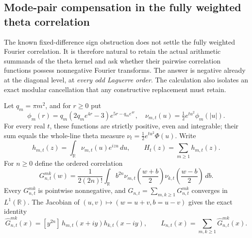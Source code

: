 \subsection{Mode-pair compensation in the fully weighted theta correlation}
\label{sec:modepaircompensation}

The known fixed-difference sign obstruction does not settle the
fully weighted Fourier correlation. It is therefore natural to
retain the actual arithmetic summands of the theta kernel and
ask whether their pairwise correlation functions possess
nonnegative Fourier transforms. The answer is negative already
at the diagonal level, at \emph{every odd Laguerre order}.
The calculation also isolates an exact modular cancellation
that any constructive replacement must retain.

Let \(q_m=\pi m^2\), and for \(r\ge0\) put
\[
\phi_m(r)=q_m(2q_me^{4r}-3)e^{5r-q_me^{4r}},
\quad
\nu_{m,t}(u)=\tfrac12e^{tu^2}\phi_m(|u|).
\]
For every real \(t\), these functions are strictly positive,
even and integrable; their sum equals the whole-line theta
measure \(\nu_t=\frac12e^{tu^2}\Phi(u)\). Write
\[
h_{m,t}(z)=\int_{\mathbb R}\nu_{m,t}(u)e^{izu}\,du,
\qquad H_t(z)=\sum_{m\ge1}h_{m,t}(z).
\]
For \(n\ge0\) define the ordered correlation
\begin{equation}
G^{mk}_{n,t}(w)=\frac{1}{2(2n)!}
\int_{\mathbb R}b^{2n}
\nu_{m,t}\!\left(\frac{w+b}{2}\right)
\nu_{k,t}\!\left(\frac{w-b}{2}\right)\,db.
\label{eq:modepairdef}
\end{equation}
Every \(G^{mk}_{n,t}\) is pointwise nonnegative, and
\(G_{n,t}=\sum_{m,k\ge1}G^{mk}_{n,t}\) converges in
\(L^1(\mathbb R)\). The Jacobian of
\((u,v)\mapsto(w=u+v,b=u-v)\) gives the exact identity
\begin{equation}
\widehat G^{mk}_{n,t}(x)
=[y^{2n}]\,h_{m,t}(x+iy)h_{k,t}(x-iy),
\qquad
L_{n,t}(x)=\sum_{m,k\ge1}\widehat G^{mk}_{n,t}(x).
\label{eq:modepairFourier}
\end{equation}

